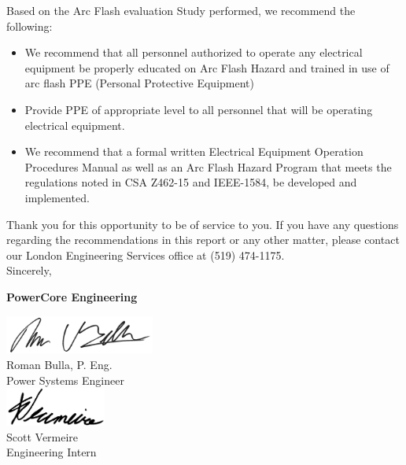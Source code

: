 Based on the Arc Flash evaluation Study performed, we recommend the following:
\begin{itemize}
\item We recommend that all personnel authorized to operate any electrical equipment be properly educated on Arc Flash Hazard and trained  in use of arc flash PPE (Personal Protective Equipment)

\item	Provide PPE of appropriate level to all personnel that will be operating electrical equipment.

\item	We recommend that a formal written Electrical Equipment Operation Procedures Manual as well as an Arc Flash Hazard Program that meets the regulations noted in CSA Z462-15 and IEEE-1584, be developed and implemented.
\end{itemize}
\vspace{10mm}
\noindent Thank you for this opportunity to be of service to you.  If you have any questions regarding the recommendations in this report or any other matter, please contact our London Engineering Services office at (519) 474-1175. \newline
\vspace{5mm}
\\
\noindent Sincerely,\newline

\vspace{5mm}
\noindent\textbf{PowerCore Engineering}\newline

\begin{multicols}{2}
\centering
\includegraphics[height=0.5in, keepaspectratio=true]{../Images/Roman_signature.jpg} \\
Roman Bulla, P. Eng. \\Power Systems Engineer \\
\includegraphics[height=0.5in, keepaspectratio=true]{../Images/Scott_signature.jpg} \\
Scott Vermeire \\Engineering Intern \\
\end{multicols}

